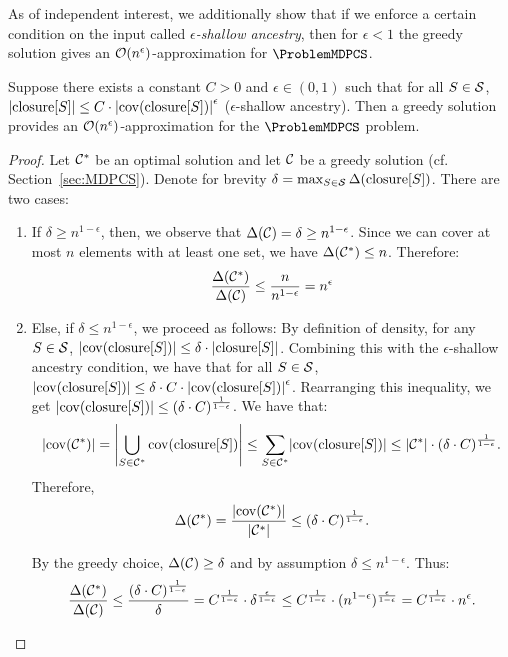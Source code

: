 As of independent interest, we additionally show that if we enforce a certain condition on the input called \emph{$\epsilon$-shallow ancestry}, then for $\epsilon <1$  the greedy solution gives an $\mathcal{O}\mathopen{}\left( n^\epsilon \right)$-approximation for $\ProblemMDPCS$.
\begin{theorem}\label{thm:MDPCS-shallow-ancestry}
Suppose there exists a constant $C > 0$ and $\epsilon \in (0, 1)$ such that for all $S \in \mathcal{S}$,
$
\mathopen{}\left| \operatorname{closure}[S] \right| \leq C \cdot
\mathopen{}\left| \operatorname{cov}\mathopen{}\left( \operatorname{closure}[S] \right) \right|^\epsilon
$ ($\epsilon$-shallow ancestry).
Then a greedy solution provides an $\mathcal{O}(n^\epsilon)$-approximation for the $\ProblemMDPCS$ problem.
\end{theorem}

\begin{proof}
 Let $\mathcal{C}^*$ be an optimal solution and let $\mathcal{C}$ be a greedy solution (cf. Section~\ref{sec:MDPCS}).
 Denote for brevity $\delta = \max_{S \in \mathcal{S}} \Delta\mathopen{}\left( \operatorname{closure}[S] \right)$.
 There are two cases:
\begin{enumerate}
    \item If $\delta \geq n^{1-\epsilon}$, then, we observe that $\Delta\mathopen{}\left( \mathcal{C} \right) = \delta \geq n^{1-\epsilon}$. Since we can cover at most $n$ elements with at least one set, we have $\Delta\mathopen{}\left( \mathcal{C}^* \right) \leq n$. Therefore:
\[
\frac{\Delta\mathopen{}\left( \mathcal{C}^* \right)}{\Delta\mathopen{}\left( \mathcal{C} \right)} \leq \frac{n}{n^{1-\epsilon}} = n^\epsilon
\]
    \item Else, if $\delta \leq n^{1-\epsilon}$, we proceed as follows: By definition of density, for any $S \in
     \mathcal{S}$, $\mathopen{}\left| \operatorname{cov}\mathopen{}\left( \operatorname{closure}[S] \right) \right| \leq \delta \cdot \mathopen{}\left| \operatorname{closure}[S] \right|$. Combining this with the $\epsilon$-shallow ancestry condition, we have that for all $S \in \mathcal{S}$, $
\mathopen{}\left| \operatorname{cov}\mathopen{}\left( \operatorname{closure}[S] \right) \right| \leq \delta \cdot C \cdot \mathopen{}\left| \operatorname{cov}\mathopen{}\left( \operatorname{closure}[S] \right) \right|^\epsilon
$. Rearranging this inequality, we get $
\mathopen{}\left| \operatorname{cov}\mathopen{}\left( \operatorname{closure}[S] \right) \right| \leq (\delta \cdot C)^{\frac{1}{1-\epsilon}}
$. We have that:
\[
\mathopen{}\left| \operatorname{cov}\mathopen{}\left( \mathcal{C}^* \right) \right| = \mathopen{}\left| \bigcup_{S\in\mathcal{C}^*}\operatorname{cov}\mathopen{}\left( \operatorname{closure}[S] \right) \right| \leq \sum_{S\in\mathcal{C}^*} \mathopen{}\left| \operatorname{cov}\mathopen{}\left( \operatorname{closure}[S] \right) \right| \leq \mathopen{}\left| \mathcal{C}^* \right| \cdot (\delta \cdot C)^{\frac{1}{1-\epsilon}}.
\]
Therefore,
\[
\Delta\mathopen{}\left( \mathcal{C}^* \right)= \frac{\mathopen{}\left| \operatorname{cov}\mathopen{}\left( \mathcal{C}^* \right) \right|}{\mathopen{}\left| \mathcal{C}^* \right|} \leq (\delta \cdot C)^{\frac{1}{1-\epsilon}}.
\]

By the greedy choice, $\Delta\mathopen{}\left( \mathcal{C} \right) \geq \delta$ and by assumption $\delta \leq n^{1-\epsilon}$. Thus:
\[
\frac{\Delta\mathopen{}\left( \mathcal{C}^* \right)}{\Delta\mathopen{}\left( \mathcal{C} \right)} \leq \frac{(\delta \cdot C)^{\frac{1}{1-\epsilon}}}{\delta} = C^{\frac{1}{1-\epsilon}} \cdot \delta^{\frac{\epsilon}{1-\epsilon}} \leq C^{\frac{1}{1-\epsilon}} \cdot (n^{1-\epsilon})^{\frac{\epsilon}{1-\epsilon}} = C^{\frac{1}{1-\epsilon}} \cdot n^\epsilon.
\]
\end{enumerate}
\end{proof}

